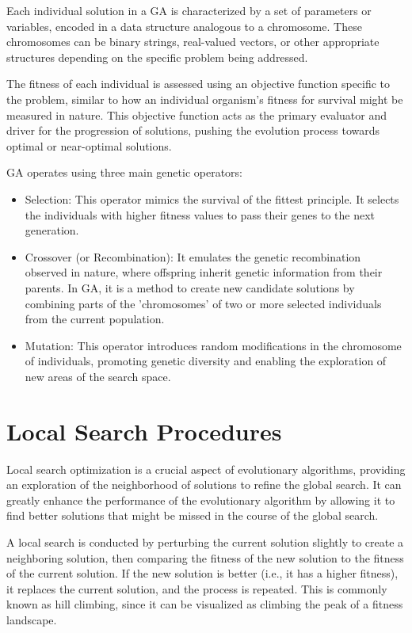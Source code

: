 \documentclass[twoside]{ctuthesis}
\theoremstyle{plain}
\theoremstyle{definition}
\theoremstyle{note}
\begin{document}
Each individual solution in a GA is characterized by a set of parameters or variables, encoded in a data structure analogous to a chromosome. These chromosomes can be binary strings, real-valued vectors, or other appropriate structures depending on the specific problem being addressed.

The fitness of each individual is assessed using an objective function specific to the problem, similar to how an individual organism's fitness for survival might be measured in nature. This objective function acts as the primary evaluator and driver for the progression of solutions, pushing the evolution process towards optimal or near-optimal solutions.

GA operates using three main genetic operators:
\begin{itemize}
	\item Selection: This operator mimics the survival of the fittest principle. It selects the individuals with higher fitness values to pass their genes to the next generation.
	\item Crossover (or Recombination): It emulates the genetic recombination observed in nature, where offspring inherit genetic information from their parents. In GA, it is a method to create new candidate solutions by combining parts of the 'chromosomes' of two or more selected individuals from the current population.
	\item Mutation: This operator introduces random modifications in the chromosome of individuals, promoting genetic diversity and enabling the exploration of new areas of the search space.
\end{itemize}

\section{Local Search Procedures}
\label{sec:localsearch}
Local search optimization is a crucial aspect of evolutionary algorithms, providing an exploration of the neighborhood of solutions to refine the global search. It can greatly enhance the performance of the evolutionary algorithm by allowing it to find better solutions that might be missed in the course of the global search.

A local search is conducted by perturbing the current solution slightly to create a neighboring solution, then comparing the fitness of the new solution to the fitness of the current solution. If the new solution is better (i.e., it has a higher fitness), it replaces the current solution, and the process is repeated. This is commonly known as hill climbing, since it can be visualized as climbing the peak of a fitness landscape.
\end{document}
